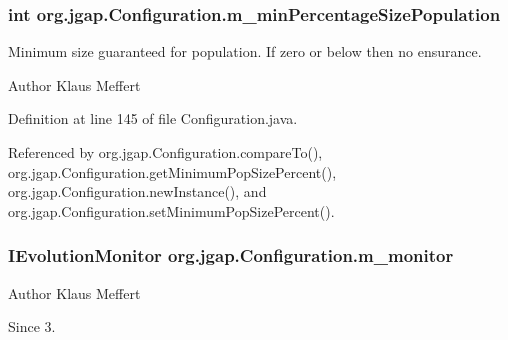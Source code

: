 \hypertarget{classorg_1_1jgap_1_1_configuration_a324033a53478579513a9fcf0c444472a}{
\subsubsection[{m\-\_\-min\-Percentage\-Size\-Population}]{\setlength{\rightskip}{0pt plus 5cm}int org.\-jgap.\-Configuration.\-m\-\_\-min\-Percentage\-Size\-Population\hspace{0.3cm}{\ttfamily [private]}}}\label{classorg_1_1jgap_1_1_configuration_a324033a53478579513a9fcf0c444472a}
Minimum size guaranteed for population. If zero or below then no ensurance.

\begin{DoxyAuthor}{Author}
Klaus Meffert 
\end{DoxyAuthor}


Definition at line 145 of file Configuration.\-java.



Referenced by org.\-jgap.\-Configuration.\-compare\-To(), org.\-jgap.\-Configuration.\-get\-Minimum\-Pop\-Size\-Percent(), org.\-jgap.\-Configuration.\-new\-Instance(), and org.\-jgap.\-Configuration.\-set\-Minimum\-Pop\-Size\-Percent().

\hypertarget{classorg_1_1jgap_1_1_configuration_a6e584063d1fe448e9faa3220d232eebc}{
\subsubsection[{m\-\_\-monitor}]{\setlength{\rightskip}{0pt plus 5cm}I\-Evolution\-Monitor org.\-jgap.\-Configuration.\-m\-\_\-monitor\hspace{0.3cm}{\ttfamily [private]}}}\label{classorg_1_1jgap_1_1_configuration_a6e584063d1fe448e9faa3220d232eebc}
\begin{DoxyAuthor}{Author}
Klaus Meffert 
\end{DoxyAuthor}
\begin{DoxySince}{Since}
3. 
\end{DoxySince}


